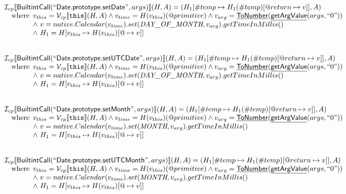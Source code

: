 \documentclass{article}
\makeatletter
\newcommand{\SF}[1]{\mbox{\textsf{#1}}}
\newcommand{\TT}[1]{\mbox{\texttt{#1}}}
\newcommand{\wherec}[1]{{\rm where}\begin{array}[t]{l}#1\end{array}}
\newcommand{\I}{\mathcal{I}}
\newcommand{\V}{\mathcal{V}}
\newcommand{\lbr}{\llbracket}
\newcommand{\rbr}{\rrbracket}
\newcommand{\hf}[1]{\underline{\sf #1}}
\newcommand{\varprop}[1]{@#1}
\makeatother
\begin{document}
\[
\begin{array}{l}


\I _{cp}\lbr \SF{BuiltintCall}(``\SF{Date.prototype.setDate}",args)\rbr(H,A)
  = (H_1[\#temp \mapsto H_1(\#temp)[@return \mapsto v]], A)\\
\quad\wherec{
  v_{this} = \V _{cp}\lbr \TT{this}\rbr (H,A) \land v_{time} = H(v_{this})(@primitive)
  \land v_{arg} = \hf{ToNumber}(\hf{getArgValue}(args, ``0"))\\
  \land\ v = native.Calendar(v_{time}).set(\emph{DAY\_OF\_MONTH}, v_{arg}).getTimeInMillis()\\
  \land\ H_1 = H[v_{this} \mapsto H(v_{this})[\varprop \mapsto v]]
  }\\
\\\\


\I _{cp}\lbr \SF{BuiltintCall}(``\SF{Date.prototype.setUTCDate}",args)\rbr(H,A)
  = (H_1[\#temp \mapsto H_1(\#temp)[@return \mapsto v]], A)\\
\quad\wherec{
  v_{this} = \V _{cp}\lbr \TT{this}\rbr (H,A) \land v_{time} = H(v_{this})(@primitive)
  \land v_{arg} = \hf{ToNumber}(\hf{getArgValue}(args, ``0"))\\
  \land\ v = native.Calendar(v_{time}).set(\emph{DAY\_OF\_MONTH}, v_{arg}).getTimeInMillis()\\
  \land\ H_1 = H[v_{this} \mapsto H(v_{this})[\varprop \mapsto v]]
  }\\
\\\\


\I _{cp}\lbr \SF{BuiltintCall}(``\SF{Date.prototype.setMonth}",args)\rbr(H,A)
  = (H_1[\#temp \mapsto H_1(\#temp)[@return \mapsto v]], A)\\
\quad\wherec{
  v_{this} = \V _{cp}\lbr \TT{this}\rbr (H,A) \land v_{time} = H(v_{this})(@primitive)
  \land v_{arg} = \hf{ToNumber}(\hf{getArgValue}(args, ``0"))\\
  \land\ v = native.Calendar(v_{time}).set(\emph{MONTH}, v_{arg}).getTimeInMillis()\\
  \land\ H_1 = H[v_{this} \mapsto H(v_{this})[\varprop \mapsto v]]
  }\\
\\\\


\I _{cp}\lbr \SF{BuiltintCall}(``\SF{Date.prototype.setUTCMonth}",args)\rbr(H,A)
  = (H_1[\#temp \mapsto H_1(\#temp)[@return \mapsto v]], A)\\
\quad\wherec{
  v_{this} = \V _{cp}\lbr \TT{this}\rbr (H,A) \land v_{time} = H(v_{this})(@primitive)
  \land v_{arg} = \hf{ToNumber}(\hf{getArgValue}(args, ``0"))\\
  \land\ v = native.Calendar(v_{time}).set(\emph{MONTH}, v_{arg}).getTimeInMillis()\\
  \land\ H_1 = H[v_{this} \mapsto H(v_{this})[\varprop \mapsto v]]
  }\\
\\\\



\end{array}\]
\end{document}
